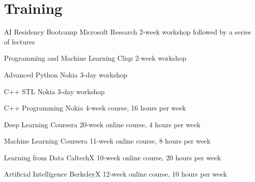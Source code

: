 \documentclass[]{friggeri-cv_osx}
\begin{document}
\section{Training}
\begin{entrylist}
\entry
{}
{AI Residency Bootcamp}
{Microsoft Research}
{2-week workshop followed by a series of lectures}

\entry
{}
{Programming and Machine Learning}
{Cliqz}
{2-week workshop}

\entry
{}
{Advanced Python}
{Nokia}
{3-day workshop}

\entry
{}
{C++ STL}
{Nokia}
{3-day workshop}

\entry
{}
{C++ Programming}
{Nokia}
{4-week course, 16 hours per week}

\entry
{}
{Deep Learning}
{Coursera}
{20-week online course, 4 hours per week}

\entry
{}
{Machine Learning}
{Coursera}
{11-week online course, 8 hours per week}

\entry
{}
{Learning from Data}
{CaltechX}
{10-week online course, 20 hours per week}

\entry
{}
{Artificial Intelligence}
{BerkeleyX}
{12-week online course, 10 hours per week}
\end{entrylist}
\end{document}
